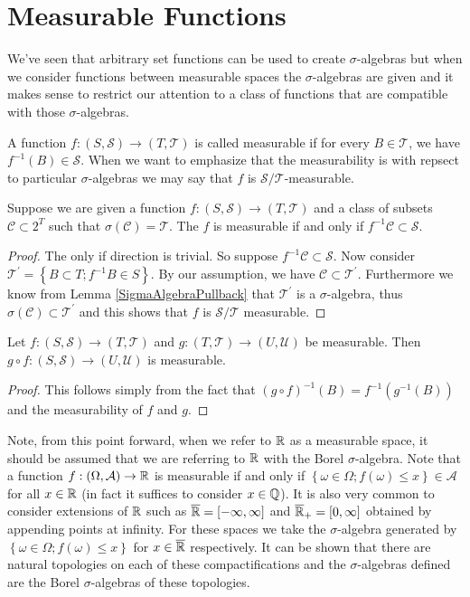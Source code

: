 \section{Measurable Functions}
We've seen that arbitrary set functions can be used to create
$\sigma$-algebras but when we consider functions between
measurable spaces the $\sigma$-algebras are given and it makes sense
to restrict our attention to a class of functions that are compatible
with those $\sigma$-algebras.
\begin{defn}A function $f : (S,\mathcal{S}) \to (T,\mathcal{T})$ is
  called measurable if for every $B \in \mathcal{T}$, we have
  $f^{-1}(B) \in \mathcal{S}$.  When we want to emphasize that the
  measurability is with repsect to particular $\sigma$-algebras we may
  say that $f$ is $\mathcal{S}/\mathcal{T}$-measurable.
\end{defn}
\begin{lem}\label{MeasurableByGeneratingSet}Suppose we are given a function $f : (S,\mathcal{S}) \to
  (T,\mathcal{T})$ and a class of subsets $\mathcal{C} \subset 2^T$
  such that $\sigma(\mathcal{C}) = \mathcal{T}$.  The $f$ is
  measurable if and only if $f^{-1} \mathcal{C} \subset \mathcal{S}$.
\end{lem}
\begin{proof}The only if direction is trivial.  So suppose $f^{-1}  \mathcal{C} \subset \mathcal{S}$.
Now consider $\mathcal{T}^\prime = \left \{ B \subset T; f^{-1} B \in
  S \right \}$.  By our assumption, we have $\mathcal{C} \subset
\mathcal{T}^\prime$.  Furthermore we know from
Lemma \ref{SigmaAlgebraPullback} that $\mathcal{T}^\prime$ is
a $\sigma$-algebra, thus $\sigma(\mathcal{C}) \subset
\mathcal{T}^\prime$ and this shows that $f$ is
$\mathcal{S}/\mathcal{T}$ measurable.
\end{proof}
\begin{lem}\label{CompositionOfMeasurable}Let $f:(S,\mathcal{S}) \to (T,\mathcal{T})$
  and $g:(T,\mathcal{T}) \to (U,\mathcal{U})$ be measurable.  Then $g
  \circ f :(S,\mathcal{S}) \to (U,\mathcal{U})$ is measurable.
\end{lem}
\begin{proof}This follows simply from the fact that $(g \circ
  f)^{-1}(B) = f^{-1}(g^{-1}(B))$ and the measurability of $f$ and $g$.
\end{proof}
Note, from this point forward, when we refer to $\mathbb{R}$ as a
measurable space, it should be assumed that we are referring to
$\mathbb{R}$ with the Borel $\sigma$-algebra.  Note that a function
$f:(\Omega, \mathcal{A}) \to \mathbb{R}$ is measurable if and only if
$\left \{\omega \in \Omega ; f(\omega) \leq x \right \} \in \mathcal{A}$ for all $x \in \mathbb{R}$ (in fact
it suffices to consider $x \in \mathbb{Q}$).  It is also very common to consider
extensions of $\mathbb{R}$ such as $\overline{\mathbb{R}} = [-\infty,\infty]$
and $\overline{\mathbb{R}}_+ = [0,\infty]$
obtained by appending points at infinity.  For these spaces we take the $\sigma$-algebra
generated by $\left \{\omega \in \Omega ; f(\omega) \leq x \right \}$
for $x \in \overline{\mathbb{R}}$ respectively.  It can be shown that
there are natural topologies on each of these compactifications and
the $\sigma$-algebras defined are the Borel $\sigma$-algebras of these topologies.

